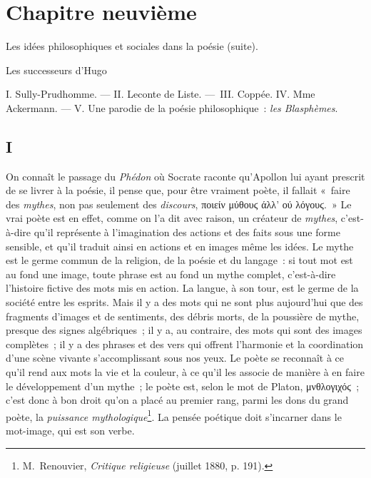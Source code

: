 \documentclass[french,twoside]{book} %
\newcommand\chapteropen{} %
\newcommand\chaptercont{} %
\begin{document}
\chapteropen
\chapter[{Chapitre neuvième}]{Chapitre neuvième}\renewcommand{\leftmark}{Chapitre neuvième}

\begin{center}Les idées philosophiques et sociales dans la poésie (suite).\end{center}
\begin{center}Les successeurs d’Hugo\end{center}

\chaptercont
\noindent I. Sully-Prudhomme. — II. Leconte de Liste. — III. Coppée. IV. Mme Ackermann. — V. Une parodie de la poésie philosophique : \emph{les Blasphèmes}.\par
\section[{I}]{I}
\noindent On connaît le passage du \emph{Phédon} où Socrate raconte qu’Apollon lui ayant prescrit de se livrer à la poésie, il pense que, pour être vraiment poète, il fallait « faire des \emph{mythes}, non pas seulement des \emph{discours}, ποιείν μύθουϛ άλλ’ ού λόγουϛ. » Le vrai poète est en effet, comme on l’a dit avec raison, un créateur de \emph{mythes}, c’est-à-dire qu’il représente à l’imagination des actions et des faits sous une forme sensible, et qu’il traduit ainsi en actions et en images même les idées. Le mythe est le germe commun de la religion, de la poésie et du langage : si tout mot est au fond une image, toute phrase est au fond un mythe complet, c’est-à-dire l’histoire fictive des mots mis en action. La langue, à son tour, est le germe de la société entre les esprits. Mais il y a des mots qui ne sont plus aujourd’hui que des fragments d’images et de sentiments, des débris morts, de la poussière de mythe, presque des signes algébriques ; il y a, au contraire, des mots qui sont des images complètes ; il y a des phrases et des vers qui offrent l’harmonie et la coordination d’une scène vivante s’accomplissant sous nos yeux. Le poète se reconnaît à ce qu’il rend aux mots la vie et la couleur, à ce qu’il les associe de manière à en faire le développement d’un mythe ; le poète est, selon le mot de Platon, μνθλογιχόϛ ; c’est donc à bon droit qu’on a placé au premier rang, parmi les dons du grand poète, la \emph{puissance mythologique}\footnote{ M. Renouvier, \emph{Critique religieuse} (juillet 1880, p. 191).}. La pensée poétique doit s’incarner dans le mot-image, qui est son verbe.\par
\end{document}
